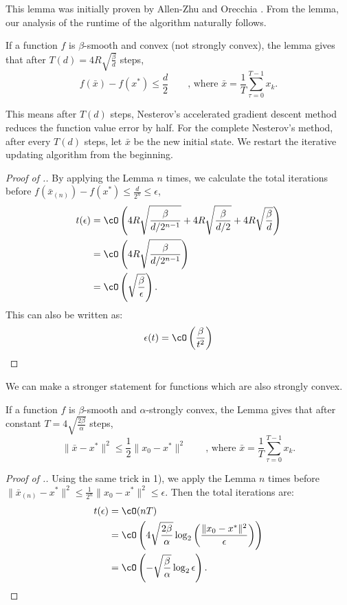 This lemma was initially proven by Allen-Zhu and Orecchia \cite{allen2014linear}. From the lemma, our analysis of the runtime of the algorithm naturally follows.

\begin{theorem}
 If a function $f$ is $\beta$-smooth and convex (not strongly convex), the lemma gives that after $T(d)=4R\sqrt{\frac{\beta}{d}}$ steps, 
\[f(\bar{x})- f(x^*)\leq \frac{d}{2}\qquad\text{, where } \bar{x} = \frac{1}{T}\sum_{\tau=0}^{T-1}x_k.\]
\end{theorem}
This means after $T(d)$ steps, Nesterov's accelerated gradient descent method reduces the function value error by half. For the complete Nesterov's method, after every $T(d)$ steps, let $\bar{x}$ be the new initial state. We restart the iterative updating algorithm from the beginning. %
\begin{proof}
[Proof of .]
\indent By applying the Lemma $n$ times, we calculate the total iterations before $f(\bar{x}_{(n)})-f(x^*)\leq\frac{d}{2^{n}}\leq\epsilon$,
\begin{align*}
t(\epsilon) &= \cO \left(4R\sqrt{\frac{\beta}{d/2^{n-1}}} + 4R\sqrt{\frac{\beta}{d/2}} + 4R\sqrt{\frac{\beta}{d}}\right)\\
  &= \cO \left(4R\sqrt{\frac{\beta}{d/2^{n-1}}}\right)\\
  &= \cO \left(\sqrt{\frac{\beta}{\epsilon}}\right).
\end{align*}
\indent This can also be written as: 
\[\epsilon(t) = \cO \left(\frac{\beta}{t^2} \right)\]
\end{proof}

We can make a stronger statement for functions which are also strongly convex.

\begin{theorem}
If a function $f$ is $\beta$-smooth and $\alpha$-strongly convex, the Lemma gives that after constant $T=4\sqrt{\frac{2\beta}{\alpha}}$ steps,
\[\|\bar{x} - x^*\|^2 \leq \frac{1}{2}\|x_0 - x^*\|^2 \qquad\text{, where } \bar{x} = \frac{1}{T}\sum_{\tau=0}^{T-1}x_k.\]
\end{theorem}

\begin{proof}[Proof of .]
\indent Using the same trick in 1), we apply the Lemma $n$ times before $\|\bar{x}_{(n)} - x^*\|^2 \leq \frac{1}{2^n}\|x_0 - x^*\|^2 \leq \epsilon$. Then the total iterations are:
\begin{align*}
t(\epsilon) &= \cO(nT)\\
            &= \cO \left (4\sqrt{\frac{2\beta}{\alpha}}\log_2 \left (\frac{\|x_0 - x^*\|^2}{\epsilon} \right) \right)\\
            &= \cO \left(-\sqrt{\frac{\beta}{\alpha}}\log_2\epsilon \right).
\end{align*}
\end{proof}

